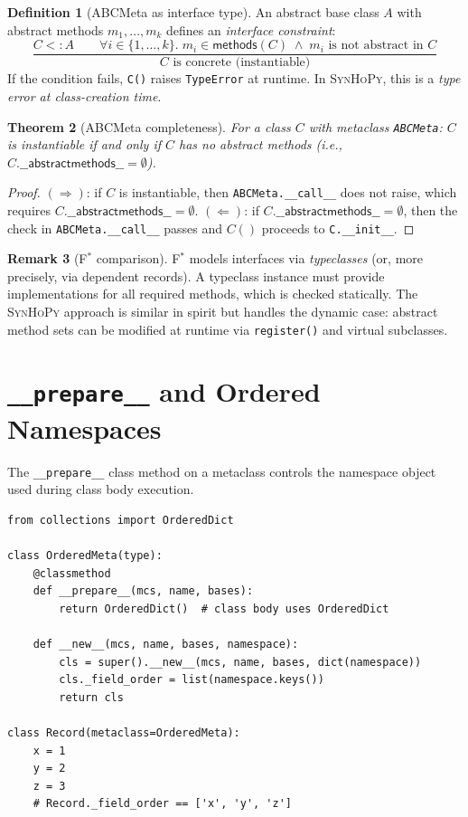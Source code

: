 \documentclass[11pt,a4paper]{report}
\theoremstyle{definition}
\newtheorem{definition}{Definition}[chapter]
\newtheorem{remark}[definition]{Remark}
\theoremstyle{plain}
\newtheorem{theorem}[definition]{Theorem}
\newcommand{\fstar}{F$^{*}$}
\newcommand{\synhopy}{\textsc{SynHoPy}}
\begin{document}
\begin{definition}[ABCMeta as interface type]
\label{def:abcmeta}
An abstract base class $A$ with abstract methods $m_1, \ldots, m_k$ defines
an \emph{interface constraint}:
\[
  \frac{
    C <: A \qquad
    \forall i \in \{1, \ldots, k\}.\; m_i \in \mathsf{methods}(C) \;\wedge\;
      m_i \text{ is not abstract in } C
  }{
    C \text{ is concrete (instantiable)}
  }
\]
If the condition fails, \lstinline[style=python]{C()} raises
\lstinline[style=python]{TypeError} at runtime.  In \synhopy{}, this
is a \emph{type error at class-creation time}.
\end{definition}

\begin{theorem}[ABCMeta completeness]
\label{thm:abc-complete}
For a class $C$ with metaclass \lstinline[style=python]{ABCMeta}:
$C$ is instantiable if and only if $C$ has no abstract methods (i.e.,
$C.\mathsf{\_\_abstractmethods\_\_} = \emptyset$).
\end{theorem}
\begin{proof}
$(\Rightarrow)$: if $C$ is instantiable, then
\lstinline[style=python]{ABCMeta.__call__} does not raise, which requires
$C.\mathsf{\_\_abstractmethods\_\_} = \emptyset$.
$(\Leftarrow)$: if $C.\mathsf{\_\_abstractmethods\_\_} = \emptyset$,
then the check in \lstinline[style=python]{ABCMeta.__call__} passes and
$C()$ proceeds to \lstinline[style=python]{C.__init__}.
\end{proof}

\begin{remark}[\fstar{} comparison]
\fstar{} models interfaces via \emph{typeclasses} (or, more precisely, via
dependent records).  A typeclass instance must provide implementations for
all required methods, which is checked statically.  The \synhopy{} approach
is similar in spirit but handles the dynamic case: abstract method sets can
be modified at runtime via \lstinline[style=python]{register()} and virtual
subclasses.
\end{remark}

\section{\texttt{\_\_prepare\_\_} and Ordered Namespaces}

The \lstinline[style=python]{__prepare__} class method on a metaclass controls
the namespace object used during class body execution.

\begin{lstlisting}[style=python]
from collections import OrderedDict

class OrderedMeta(type):
    @classmethod
    def __prepare__(mcs, name, bases):
        return OrderedDict()  # class body uses OrderedDict

    def __new__(mcs, name, bases, namespace):
        cls = super().__new__(mcs, name, bases, dict(namespace))
        cls._field_order = list(namespace.keys())
        return cls

class Record(metaclass=OrderedMeta):
    x = 1
    y = 2
    z = 3
    # Record._field_order == ['x', 'y', 'z']
\end{lstlisting}
\end{document}
